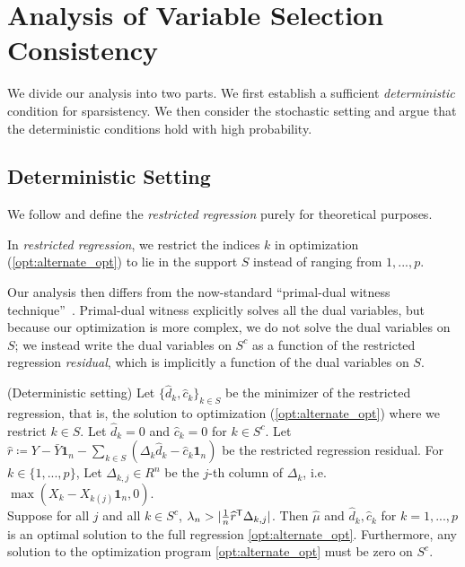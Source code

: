 \section{Analysis of Variable Selection Consistency}

We divide our analysis into two parts. We first establish a sufficient
\emph{deterministic} condition for sparsistency.  We then consider the
stochastic setting and argue that the deterministic conditions hold with high probability. 

\subsection{Deterministic Setting}

We follow \cite{Wain:09a} and define the \emph{restricted regression} purely for theoretical purposes.
\begin{definition}
In \emph{restricted regression}, we restrict the indices $k$ in
optimization (\ref{opt:alternate_opt}) to lie in the support $S$ instead of ranging from $1,...,p$. 
\end{definition}

Our analysis then differs from the now-standard ``primal-dual witness
technique''~\cite{Wain:09a}. Primal-dual witness explicitly solves all the dual variables, but because our optimization is more complex, we do not solve the dual variables on $S$; we instead write the dual variables on $S^c$ as a function of the restricted regression \emph{residual}, which is implicitly a function of the dual variables on $S$.

\begin{theorem} (Deterministic setting)
\label{thm:deterministic}
Let $\{\hat{d}_k, \hat{c}_k\}_{k \in S}$ be the minimizer of the restricted regression, that is, the solution to optimization (\ref{opt:alternate_opt}) where we restrict $k \in S$. Let $\hat{d}_k = 0$ and $ \hat{c}_k = 0$ for $k \in S^c$.
Let $\hat{r} \coloneqq Y - \bar{Y}\mathbf{1}_n - \sum_{k \in S} (\Delta_k \hat{d}_k -
\hat{c}_k \mathbf{1}_n)$ be the restricted regression residual. For $k
\in \{1,...,p\}$, Let $\Delta_{k, j} \in R^n$ be the $j$-th column of $\Delta_k$, i.e. $\max( X_k - X_{k (j)} \mathbf{1}_n, 0)$. \\

Suppose for all $j$ and all $k\in S^c$, $\lambda_n > | \frac{1}{n}
\widehat{r}^{\mathsf{T}} \Delta_{k,j}|$. Then $\hat{\mu}$ and $\hat{d}_k, \hat{c}_k$ for $k=1,...,p$ is an optimal solution to the full regression \ref{opt:alternate_opt}. Furthermore, any solution to the optimization program \ref{opt:alternate_opt} must be zero on $S^c$.
\end{theorem}

